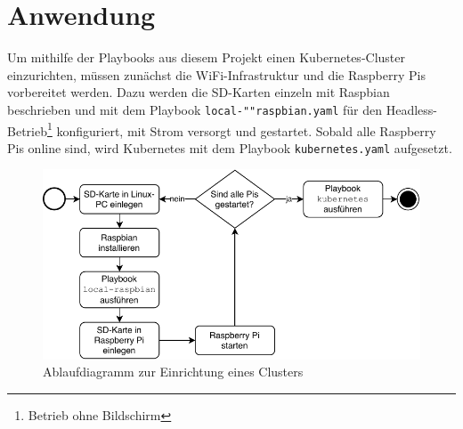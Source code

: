 \chapter{Anwendung}\label{ch:anwendung}

Um mithilfe der Playbooks aus diesem Projekt einen Kubernetes-Cluster einzurichten, müssen zunächst die WiFi-Infrastruktur und die Raspberry Pis vorbereitet werden.
Dazu werden die SD-Karten einzeln mit Raspbian beschrieben und mit dem Playbook \texttt{local-""raspbian.yaml} für den Headless-Betrieb\footnote{Betrieb ohne Bildschirm} konfiguriert, mit Strom versorgt und gestartet.
Sobald alle Raspberry Pis online sind, wird Kubernetes mit dem Playbook \texttt{kubernetes.yaml} aufgesetzt.

\begin{figure}[h]
    \centering
    \includegraphics[width=\textwidth]{img/anwendung.pdf}
    \caption{Ablaufdiagramm zur Einrichtung eines Clusters}
\end{figure}

